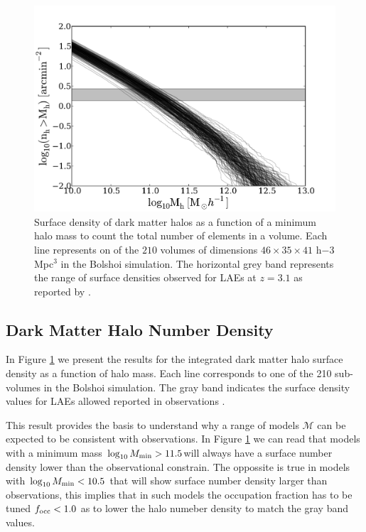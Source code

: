 \documentclass[usenatbib]{mn2e}
\newcommand{\hMsun}{{\ifmmode{h^{-1}{\rm {M_{\odot}}}}\else{$h^{-1}{\rm{M_{\odot}}}$}\fi}}
\begin{document}
\begin{figure}
\begin{center}
\includegraphics[width=1.10\linewidth,angle=0]{./plots/Fig1.pdf}
\caption{ \label{fig:halos} Surface density of dark
  matter halos as a function of a minimum halo mass to count the
  total number of elements in a volume. Each line represents on of the
  $210$ volumes of dimensions $46\times 35\times 41$ h${-3}$Mpc$^{3}$
  in the Bolshoi simulation. The horizontal grey band represents the
  range of surface densities observed for LAEs at $z=3.1$ as reported
  by \citep{Yamada2012}.}
\end{center} 
\end{figure}


\subsection{Dark Matter Halo Number Density}

In Figure \ref{fig:halos} we present the results for  the
integrated dark matter halo surface density as a function of halo
mass. Each line corresponds to one of the 210 sub-volumes in the
Bolshoi simulation. The gray band indicates the surface density
values for LAEs allowed reported in observations \citep{Yamada2012}.
 
This result provides the basis to understand why a range of models
${\mathcal M}$ can be expected to be consistent with
observations. In Figure \ref{fig:halos} we can read that models
with a minimum mass $\log_{10} M_{\rm min}>11.5$\hMsun will always have a
surface number density lower than the observational
constrain. The oppossite is true in models with $\log_{10} M_{\rm min}<10.5$
that will show surface number density larger than observations, this
implies that in such models the occupation fraction has to be tuned
$f_{\rm occ}<1.0$ as to lower the halo numeber density to match the
gray band values.
\end{document}
